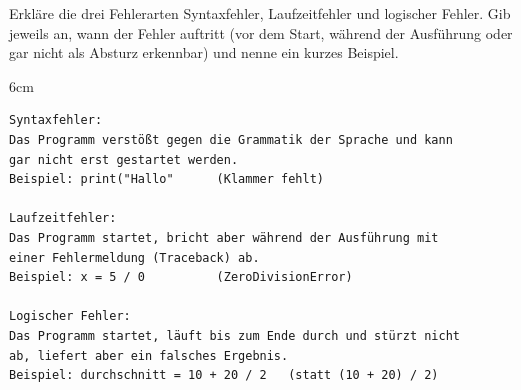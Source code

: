 \question[5]
Erkläre die drei Fehlerarten Syntaxfehler, Laufzeitfehler und logischer Fehler. 
Gib jeweils an, wann der Fehler auftritt (vor dem Start, während der Ausführung oder gar nicht als Absturz erkennbar) 
und nenne ein kurzes Beispiel.

\begin{solutionbox}{6cm}
\begin{lstlisting}
Syntaxfehler:
Das Programm verstößt gegen die Grammatik der Sprache und kann
gar nicht erst gestartet werden.
Beispiel: print("Hallo"      (Klammer fehlt)

Laufzeitfehler:
Das Programm startet, bricht aber während der Ausführung mit
einer Fehlermeldung (Traceback) ab.
Beispiel: x = 5 / 0          (ZeroDivisionError)

Logischer Fehler:
Das Programm startet, läuft bis zum Ende durch und stürzt nicht
ab, liefert aber ein falsches Ergebnis.
Beispiel: durchschnitt = 10 + 20 / 2   (statt (10 + 20) / 2)
\end{lstlisting}
\end{solutionbox}